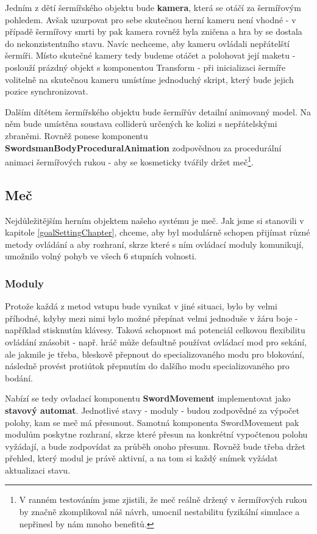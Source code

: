 Jedním z dětí šermířského objektu bude \textbf{kamera}, která se otáčí za šermířovým pohledem. Avšak uzurpovat pro sebe skutečnou herní kameru není vhodné - v případě šermířovy smrti by pak kamera rovněž byla zničena a hra by se dostala do nekonzistentního stavu. Navíc nechceme, aby kameru ovládali nepřátelští šermíři. Místo skutečné kamery tedy budeme otáčet a polohovat její maketu - poslouží prázdný objekt s komponentou Transform - při inicializaci šermíře volitelně na skutečnou kameru umístíme jednoduchý skript, který bude jejich pozice synchronizovat.

Dalším dítětem šermířského objektu bude šermířův detailní animovaný model. Na něm bude umístěna soustava colliderů určených ke kolizi s nepřátelskými zbraněmi. Rovněž ponese komponentu \textbf{SwordsmanBodyProceduralAnimation} zodpovědnou za procedurální animaci šermířových rukou - aby se kosmeticky tvářily držet meč\footnote{V ranném testováním jsme zjistili, že meč reálně držený v šermířových rukou by značně zkomplikoval náš návrh, umocnil nestabilitu fyzikální simulace a nepřinesl by nám mnoho benefitů.}.


\subsection{Meč} 

Nejdůležitějším herním objektem našeho systému je meč. Jak jsme si stanovili v kapitole \ref{goalSettingChapter}, chceme, aby byl modulárně schopen přijímat různé metody ovládání a aby rozhraní, skrze které s ním ovládací moduly komunikují, umožnilo volný pohyb ve všech 6 stupních volnosti.

\subsubsection*{Moduly} \label{interfacesSwordMovementModulesObjectModelSubsubsection}

Protože každá z metod vstupu bude vynikat v jiné situaci, bylo by velmi příhodné, kdyby mezi nimi bylo možné přepínat velmi jednoduše v žáru boje - například stisknutím klávesy. Taková schopnost má potenciál celkovou flexibilitu ovládání znásobit - např. hráč může defaultně používat ovládací mod pro sekání, ale jakmile je třeba, bleskově přepnout do specializovaného modu pro blokování, následně provést protiútok přepnutím do dalšího modu specializovaného pro bodání. 

Nabízí se tedy ovladací komponentu \textbf{SwordMovement} implementovat jako \textbf{stavový automat}. Jednotlivé stavy - moduly - budou zodpovědné za výpočet polohy, kam se meč má přesunout. Samotná komponenta SwordMovement pak modulům poskytne rozhraní, skrze které přesun na konkrétní vypočtenou polohu vyžádají, a bude zodpovídat za průběh onoho přesunu. Rovněž bude třeba držet přehled, který modul je právě aktivní, a na tom si každý snímek vyžádat aktualizaci stavu.


